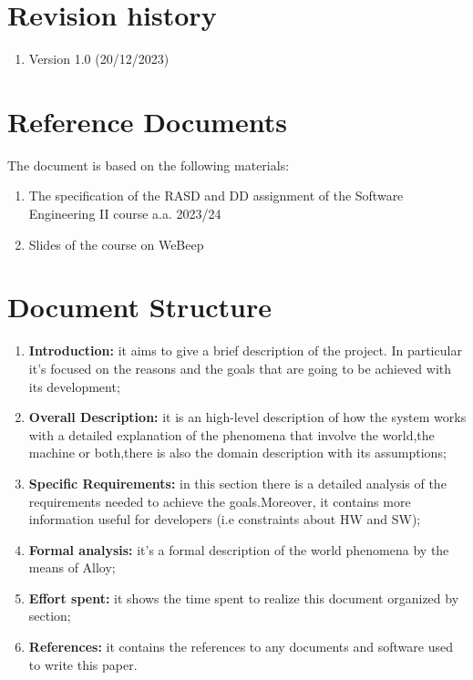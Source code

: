 \section{Revision history}
        \begin{enumerate}[label=\textbullet]
            \item Version 1.0 (20/12/2023)
        \end{enumerate}
\pagebreak
\section{Reference Documents}
The document is based on the following materials:
    \begin{enumerate}[label=\textbullet]
        \item The specification of the RASD and DD assignment of the Software Engineering II course a.a. 2023/24
        \item Slides of the course on WeBeep
    \end{enumerate}

\section{Document Structure}

    \begin{enumerate}[label=\arabic*., align=left]
        \item \textbf{Introduction: }it aims to give a brief description of the project. In particular it’s focused on the reasons and the goals that are going to be achieved with its development;
        \item \textbf{Overall Description: }it is an high-level description of how the system works with a detailed explanation of the phenomena that involve the world,the machine or both,there is also the domain description with its assumptions;
        \item \textbf{Specific Requirements: }in this section there is a detailed  analysis of the requirements needed to achieve the goals.Moreover, it contains more information useful for developers (i.e constraints about HW and SW);
        \item \textbf{Formal analysis: }it's a formal description of the world phenomena by the means of Alloy;
        \item \textbf{Effort spent: }it shows the time spent to realize this document organized by section;
         \item \textbf{References: }it contains the references to any documents and software used to write this paper.
        
    \end{enumerate}

